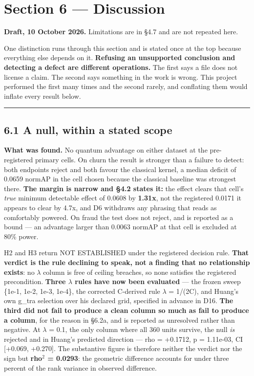 \documentclass[
  10pt,
]{article}
\newcounter{none} %
\begin{document}
\section{Section 6 --- Discussion}\label{section-6-discussion}

\textbf{Draft, 10 October 2026.} Limitations are in \S{}4.7 and are not
repeated here.

One distinction runs through this section and is stated once at the top
because everything else depends on it. \textbf{Refusing an unsupported
conclusion and detecting a defect are different operations.} The first
says a file does not license a claim. The second says something in the
work is wrong. This project performed the first many times and the
second rarely, and conflating them would inflate every result below.

\begin{center}\rule{0.5\linewidth}{0.5pt}\end{center}

\subsection{6.1 A null, within a stated
scope}\label{a-null-within-a-stated-scope}

\textbf{What was found.} No quantum advantage on either dataset at the
pre-registered primary cells. On churn the result is stronger than a
failure to detect: both endpoints reject and both favour the classical
kernel, a median deficit of 0.0659 normAP in the cell chosen because the
classical baseline was strongest there. \textbf{The margin is narrow and
\S{}4.2 states it:} the effect clears that cell's \emph{true} minimum
detectable effect of 0.0608 by \textbf{1.31x}, not the registered 0.0171
it appears to clear by 4.7x, and D6 withdraws any phrasing that reads as
comfortably powered. On fraud the test does not reject, and is reported
as a bound --- an advantage larger than 0.0063 normAP at that cell is
excluded at 80\% power.

H2 and H3 return NOT ESTABLISHED under the registered decision rule.
\textbf{That verdict is the rule declining to speak, not a finding that
no relationship exists}: no \(\lambda\) column is free of ceiling
breaches, so none satisfies the registered precondition. \textbf{Three
\(\lambda\) rules have now been evaluated} --- the frozen sweep \{1e-1,
1e-2, 1e-3, 1e-4\}, the corrected C-derived rule \(\lambda\) = 1/(2C),
and Huang's own g\_tra selection over his declared grid, specified in
advance in D16. \textbf{The third did not fail to produce a clean column
so much as fail to produce a column}, for the reason in \S{}6.2a, and is
reported as unresolved rather than negative. At \(\lambda\) = 0.1, the
only column where all 360 units survive, the null \emph{is} rejected and
in Huang's predicted direction --- rho = +0.1712, p = 1.11e-03, CI
{[}+0.069, +0.270{]}. The substantive figure is therefore neither the
verdict nor the sign but \textbf{rho\(^{2}\) = 0.0293}: the geometric
difference accounts for under three percent of the rank variance in
observed difference.
\end{document}
